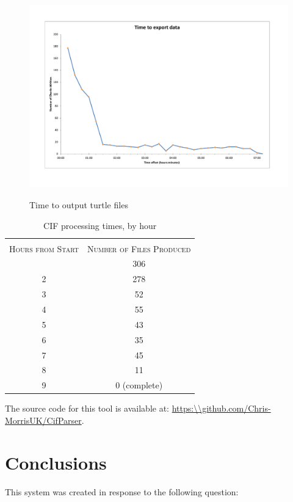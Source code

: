  \begin{figure}
\myfloatalign
{\includegraphics[width=\paperwidth]{gfx/FilesEvery15}} 
\caption{Time to output turtle files}
\label{fig:cifparsing}
\end{figure}


\noindent
\begin{table}
\begin{tabularx}{4in}{@{}cc@{}} 
\toprule \\
\textsc{Hours from Start} &  \textsc{Number of Files Produced} \\
\arrayrulecolor{LightSteelBlue}\midrule[\heavyrulewidth]
1 & 306 \\
2 & 278\\
3 & 52\\
4 & 55\\
5 & 43\\
6 & 35\\
7 & 45\\
8 & 11\\
9 & 0 (complete)\\
\bottomrule
\end{tabularx}
\caption{CIF processing times, by hour}\label{tab:cif}
\end{table}


The source code for this tool is available at: \url{https:\\github.com/Chris-MorrisUK/CifParser}.

\section{Conclusions}
\label{sec:cifconclusions}
This system was created in response to the following question: \textit{\QuestionOtherData}

